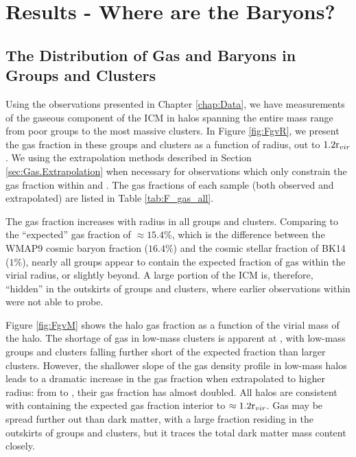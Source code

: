 \chapter{Results - Where are the Baryons?}
\label{chap:Results}

\section{The Distribution of Gas and Baryons in Groups and Clusters}
\label{sec:Spatial}

Using the observations presented in Chapter \ref{chap:Data}, we have
measurements of the gaseous component of the ICM in halos spanning the
entire mass range from poor groups to the most massive clusters. In
Figure \ref{fig:FgvR}, we present the gas fraction in these groups and
clusters as a function of radius, out to $1.2\textrm{r\ensuremath{_{vir}}}{}$. We using the
extrapolation methods described in Section \ref{sec:Gas.Extrapolation}
when necessary for observations which only constrain the gas fraction
within \rfive{} and \rtwo{}. The gas fractions of
each sample (both observed and extrapolated) are listed in Table
\ref{tab:F_gas_all}.



 

The gas fraction increases with radius in all groups and
clusters. Comparing to the ``expected'' gas fraction of $\approx
15.4\%$, which is the difference between the WMAP9 cosmic baryon
fraction ($16.4\%$) and the cosmic stellar fraction of BK14 ($1\%$),
nearly all groups appear to contain the expected fraction of gas
within the virial radius, or slightly beyond. A large portion of the
ICM is, therefore, ``hidden'' in the outskirts of groups and clusters,
where earlier observations within \rfive{} were not able to probe.



Figure \ref{fig:FgvM} shows the halo gas fraction as a function of the
virial mass of the halo. The shortage of gas in low-mass clusters is
apparent at \rfive{}, with low-mass groups and clusters falling
further short of the expected fraction than larger clusters. However,
the shallower slope of the gas density profile in low-mass halos leads
to a dramatic increase in the gas fraction when extrapolated to higher
radius: from \rfive{} to \rvir{}, their gas fraction has almost
doubled. All halos are consistent with containing the expected gas
fraction interior to $\approx1.2\textrm{r\ensuremath{_{vir}}}$. Gas may be spread further out
than dark matter, with a large fraction residing in the outskirts of
groups and clusters, but it traces the total dark matter mass content
closely.

